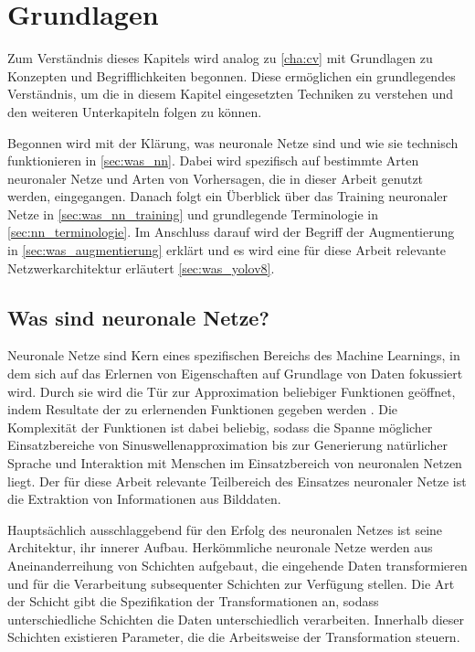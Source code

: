 
\section{Grundlagen}
\label{sec:ki:grundlagen}

Zum Verständnis dieses Kapitels wird analog zu \autoref{cha:cv} mit Grundlagen zu Konzepten und Begrifflichkeiten begonnen. Diese ermöglichen ein grundlegendes Verständnis, um die in diesem Kapitel eingesetzten Techniken zu verstehen und den weiteren Unterkapiteln folgen zu können.

Begonnen wird mit der Klärung, was neuronale Netze sind und wie sie technisch funktionieren in \autoref{sec:was_nn}. Dabei wird spezifisch auf bestimmte Arten neuronaler Netze und Arten von Vorhersagen, die in dieser Arbeit genutzt werden, eingegangen. Danach folgt ein Überblick über das Training neuronaler Netze in \autoref{sec:was_nn_training} und grundlegende Terminologie in \autoref{sec:nn_terminologie}. Im Anschluss darauf wird der Begriff der Augmentierung in \autoref{sec:was_augmentierung} erklärt und es wird eine für diese Arbeit relevante Netzwerkarchitektur erläutert \autoref{sec:was_yolov8}.


\subsection{Was sind neuronale Netze?}
\label{sec:was_nn}

Neuronale Netze sind Kern eines spezifischen Bereichs des Machine Learnings, in dem sich auf das Erlernen von Eigenschaften auf Grundlage von Daten fokussiert wird. Durch sie wird die Tür zur Approximation beliebiger Funktionen geöffnet, indem Resultate der zu erlernenden Funktionen gegeben werden \cite{cv_general}. Die Komplexität der Funktionen ist dabei beliebig, sodass die Spanne möglicher Einsatzbereiche von Sinuswellenapproximation bis zur Generierung natürlicher Sprache und Interaktion mit Menschen im Einsatzbereich von neuronalen Netzen liegt. Der für diese Arbeit relevante Teilbereich des Einsatzes neuronaler Netze ist die Extraktion von Informationen aus Bilddaten.

Hauptsächlich ausschlaggebend für den Erfolg des neuronalen Netzes ist seine Architektur, ihr innerer Aufbau. Herkömmliche neuronale Netze werden aus Aneinanderreihung von Schichten aufgebaut, die eingehende Daten transformieren und für die Verarbeitung subsequenter Schichten zur Verfügung stellen. Die Art der Schicht gibt die Spezifikation der Transformationen an, sodass unterschiedliche Schichten die Daten unterschiedlich verarbeiten. Innerhalb dieser Schichten existieren Parameter, die die Arbeitsweise der Transformation steuern.

